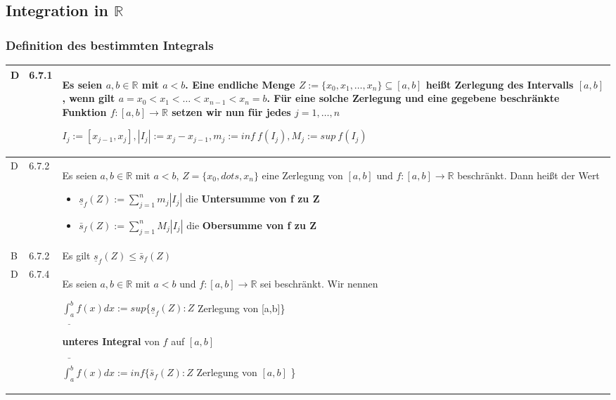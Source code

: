 \subsection{Integration in $\mathbb{R}$}
\subsubsection{Definition des bestimmten Integrals}

    \begin{longtable}{p{0.75cm} p{1cm} p{16cm}}
        \toprule

        D   & 6.7.1 &   Es seien $a,b \in \mathbb{R}$ mit $a < b$. Eine endliche Menge $Z:= \{ x_0, x_1, \dots, x_n \} \subseteq [a,b]$ heißt
                        \textbf{Zerlegung} des Intervalls $[a,b]$, wenn gilt $a = x_0 < x_1 < \dots < x_{n-1} < x_n = b$. \hfill \break
                        Für eine solche Zerlegung und eine gegebene beschränkte Funktion $f: [a,b] \rightarrow \mathbb{R}$ setzen wir nun
                        für jedes $j = 1,\dots,n$ \hfill \break
                        \centerline{$ I_j := [x_{j-1},x_j], |I_j| := x_j - x_{j-1}, m_j := inf~f(I_j), M_j := sup~f(I_j)$} \\
        \midrule
        D   & 6.7.2 &   Es seien $a,b \in \mathbb{R}$ mit $a < b$, $Z = \{ x_0, dots, x_n\}$ eine Zerlegung von $[a,b]$ und $f:[a,b]\rightarrow \mathbb{R}$
                        beschränkt. Dann heißt der Wert 
                        \begin{itemize}[topsep=-0.5cm]
                            \item[] $\underline{s}_f(Z) := \sum^{n}_{j=1} m_j |I_j|$ die \textbf{Untersumme von f zu Z}
                            \item[] $\bar{s}_f(Z) := \sum^{n}_{j=1} M_j |I_j|$ die \textbf{Obersumme von f zu Z}
                        \end{itemize} \vspace{-0cm} \\
        \midrule
        B   & 6.7.2 &   Es gilt $\underline{s}_f(Z) \leq \bar{s}_f(Z)$\\
        \midrule
        D   & 6.7.4 &   Es seien $a, b \in \mathbb{R}$ mit $ a < b$ und $f: [a,b] \rightarrow \mathbb{R}$ sei beschränkt. \hfill \break
                        Wir nennen \hfill \break
                        \centerline{$ \underline{\int_a^b} f(x) dx:= sup\{ \underline{s}_f(Z):Z$ Zerlegung von [a,b]\}}
                        \textbf{unteres Integral} von $f$ auf $[a,b]$ \hfill \break
                        \centerline{$ \bar{\int^b_a}f(x) dx := inf\{ \bar{s}_f (Z): Z$ Zerlegung von $[a,b]$ \} }

\end{longtable}

